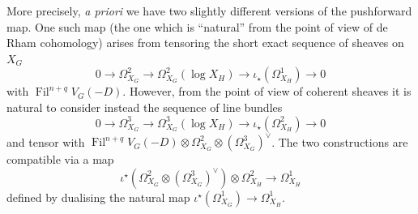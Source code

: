 \documentclass[cjm]{ipart}
\theoremstyle{plain}
\theoremstyle{remark}
\DeclareMathOperator{\Fil}{Fil}
\DeclareMathOperator{\Kl}{Kl}
\newcommand{\cO}{\mathcal{O}}
\numberwithin{equation}{subsection}
\begin{document}
   \begin{remark}
    More precisely, \emph{a priori} we have two slightly different versions of the pushforward map. One such map (the one which is ``natural'' from the point of view of de Rham cohomology) arises from tensoring the short exact sequence of sheaves on $X_G$
    \[ 0 \to \Omega^2_{X_G} \to \Omega^2_{X_G}(\log X_H) \to \iota_\star(\Omega^1_{X_H}) \to 0\]
    with $\Fil^{n+q} V_G(-D)$. However, from the point of view of coherent sheaves it is natural to consider instead the sequence of line bundles
    \[ 0 \to \Omega^3_{X_G} \to \Omega^3_{X_G}(\log X_H) \to \iota_\star(\Omega^2_{X_H}) \to 0 \]
    and tensor with $\Fil^{n+q} V_G(-D) \otimes \Omega^2_{X_G} \otimes (\Omega^3_{X_G})^\vee$. %
    The two constructions are compatible via a map
    \[ \iota^\star\left(\Omega^2_{X_G} \otimes (\Omega^3_{X_G})^\vee\right)\otimes \Omega^2_{X_H} \longrightarrow  \Omega^1_{X_H}\]
    defined by dualising the natural map
    \( \iota^\star(\Omega^1_{X_G}) \to \Omega^1_{X_H}.\)
   \end{remark}
\end{document}
